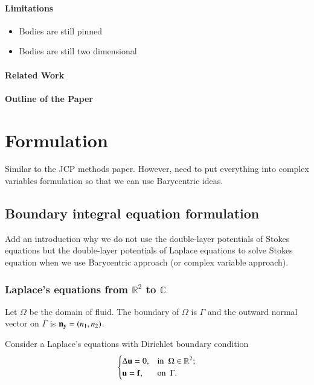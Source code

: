 \documentclass[preprint, 10pt]{elsarticle}
\newcommand{\Cdb}{\mbox{$\mathbb{C}$}}
\newcommand{\Rdb}{\mbox{$\mathbb{R}$}}
\begin{document}
\paragraph{Limitations}
\begin{itemize}
  \item Bodies are still pinned
  \item Bodies are still two dimensional
\end{itemize}

\paragraph{Related Work}

\paragraph{Outline of the Paper}

\section{Formulation}
\label{s:formulation}
Similar to the JCP methods paper.  However, need to put everything into
complex variables formulation so that we can use Barycentric ideas.


\subsection{Boundary integral equation formulation} 
\label{sec:bies}
Add an introduction why we do not use the double-layer potentials of Stokes equations but the double-layer potentials of Laplace equations to solve Stokes equation when we use Barycentric approach (or complex variable approach).
\subsubsection{Laplace's equations from $\Rdb^2$ to $\Cdb$ }

Let $\Omega$ be the domain of fluid. The boundary of $\Omega$ is $\Gamma$ and the outward normal vector on $\Gamma$ is ${\bf n_y}=(n_1,n_2)$.

Consider a Laplace's equations with Dirichlet boundary condition
\begin{equation}\label{Laplace}
  \begin{cases}
    \Delta {\bf u}=0, & \text{in}\,\,\, \Omega \in \Rdb^2;\\
    {\bf u}={\bf f}, & \text{on}\,\,\, \Gamma.
  \end{cases}
\end{equation}
\end{document}
